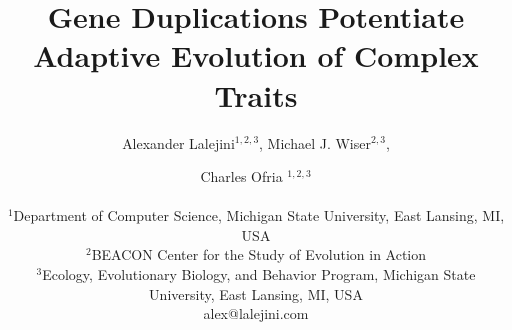 \title{Gene Duplications Potentiate Adaptive Evolution of Complex Traits}
\author{Alexander Lalejini$^{1, 2, 3}$, Michael J. Wiser$^{2, 3}$, \and Charles Ofria $^{1, 2, 3}$\\
\mbox{}\\
$^1$Department of Computer Science, Michigan State University, East Lansing, MI, USA \\
$^2$BEACON Center for the Study of Evolution in Action \\
$^3$Ecology, Evolutionary Biology, and Behavior Program, Michigan State University, East Lansing, MI, USA \\
alex@lalejini.com} %

\maketitle
